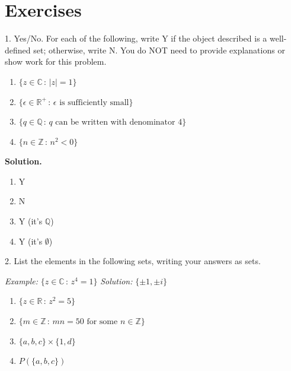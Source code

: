 \documentclass[10pt,]{book}
\theoremstyle{plain}
\theoremstyle{definition}
\theoremstyle{definition}
\theoremstyle{definition}
\theoremstyle{definition}
\numberwithin{equation}{section}
\def\Z{\mathbb{Z}}
\def\R{\mathbb{R}}
\def\Q{\mathbb{Q}}
\def\C{\mathbb{C}}
\newcommand{\lt}{ < }
\begin{document}
\section[{Exercises}]{Exercises}\label{exercises-1}
\begin{exerciselist}
\item[1.]\hypertarget{exercise-1}{}
        Yes/No. For each of the following, write Y if the object described is a well-defined set; otherwise, write N. You do NOT need to provide explanations or show work for this problem.
        \leavevmode%
\begin{enumerate}[label=(\alph*)]
\item\hypertarget{li-23}{}
              \(\{z \in \C \,:\, |z|=1\}\)
\item\hypertarget{li-24}{}
              \(\{\epsilon \in \R^+\,:\, \epsilon \mbox{ is sufficiently small} \}\)
\item\hypertarget{li-25}{}
              \(\{q\in \Q \,:\, q \mbox{ can be written  with denominator } 4\}\)
\item\hypertarget{li-26}{}
              \(\{n \in \Z\,:\, n^2 \lt 0\}\)
\end{enumerate}

\par\smallskip
\par\smallskip
\noindent\textbf{Solution.}\hypertarget{solution-1}{}\quad
\leavevmode%
\begin{multicols}{4}
\begin{enumerate}[label=(\alph*)]
\item\hypertarget{li-27}{}Y%
\item\hypertarget{li-28}{}N%
\item\hypertarget{li-29}{}Y (it's \(\Q\))%
\item\hypertarget{li-30}{}Y (it's \(\emptyset\)) %
\end{enumerate}
\end{multicols}
\item[2.]\hypertarget{exercise-2}{}
        List the elements in the following sets, writing your answers as sets.
\par

        \emph{Example:} \(\{z\in \C\,:\,z^4=1\}\) \emph{Solution:} \(\{\pm 1, \pm i\}\)
        \leavevmode%
\begin{enumerate}[label=(\alph*)]
\item\hypertarget{li-31}{}
              \(\{z\in \R\,:\, z^2=5\}\)
\item\hypertarget{li-32}{}
              \(\{m \in \Z\,:\, mn=50 \mbox{ for some } n\in \Z\}\)
\item\hypertarget{li-33}{}
              \(\{a,b,c\}\times \{1,d\}\)
\item\hypertarget{li-34}{}
              \(P(\{a,b,c\})\)
\end{enumerate}


\end{exerciselist}
\end{document}
